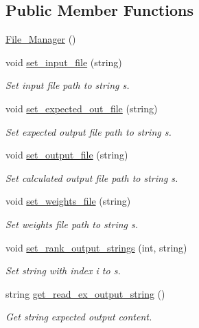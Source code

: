 \subsection*{Public Member Functions}
\begin{DoxyCompactItemize}
\item 
\hyperlink{a00001_a2acf523335c71f922a42756c1d0a7a2d}{File\-\_\-\-Manager} ()
\item 
void \hyperlink{a00001_af43b27d7ea5f031a20652a43f5b99f53}{set\-\_\-input\-\_\-file} (string)
\begin{DoxyCompactList}\small\item\em Set input file path to string s. \end{DoxyCompactList}\item 
void \hyperlink{a00001_ad83423f6db9466419d4a7acd3e322cb4}{set\-\_\-expected\-\_\-out\-\_\-file} (string)
\begin{DoxyCompactList}\small\item\em Set expected output file path to string s. \end{DoxyCompactList}\item 
void \hyperlink{a00001_a2eff082d4fe4d7f2a7ce06afbc689d45}{set\-\_\-output\-\_\-file} (string)
\begin{DoxyCompactList}\small\item\em Set calculated output file path to string s. \end{DoxyCompactList}\item 
void \hyperlink{a00001_a860e5837e1671018a26fdc0ce43603b1}{set\-\_\-weights\-\_\-file} (string)
\begin{DoxyCompactList}\small\item\em Set weights file path to string s. \end{DoxyCompactList}\item 
void \hyperlink{a00001_af80b18b12b1b619428cf7224cd588594}{set\-\_\-rank\-\_\-output\-\_\-strings} (int, string)
\begin{DoxyCompactList}\small\item\em Set string with index i to s. \end{DoxyCompactList}\item 
string \hyperlink{a00001_ad506966ba52a415b33970c057c9ed43a}{get\-\_\-read\-\_\-ex\-\_\-output\-\_\-string} ()
\begin{DoxyCompactList}\small\item\em Get string expected output content. \end{DoxyCompactList}\item 

\end{DoxyCompactItemize}
